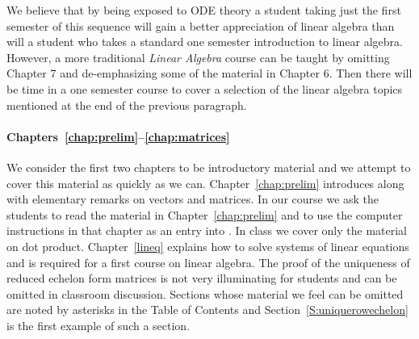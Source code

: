 \documentclass{ximera}
\begin{document}
We believe that by being exposed to ODE theory a student taking just the 
first semester of this sequence will gain a better appreciation of linear 
algebra than will a student who takes a standard one semester introduction 
to linear algebra.  However, a more traditional {\em Linear Algebra\/} course 
can be taught by omitting Chapter 7 and de-emphasizing some of the material 
in Chapter 6.  Then there will be time in a one semester course to cover a 
selection of the linear algebra topics mentioned at the end of the previous 
paragraph. 




\paragraph{Chapters~\ref{chap:prelim}--\ref{chap:matrices}}  We consider the 
first two chapters to be introductory material and we attempt to cover this 
material as quickly as we can.  Chapter~\ref{chap:prelim} introduces \Matlab 
along with elementary remarks on vectors and matrices.  In our course we ask 
the students to read the material in 
Chapter~\ref{chap:prelim} and to use the computer instructions in that
chapter as an entry into \Matlabp.  In class we cover only the material on
dot product.  Chapter~\ref{lineq} explains how to solve systems of linear
equations and is required for a first course on linear algebra.  The proof of
the uniqueness of reduced echelon form matrices is not very illuminating
for students and can be omitted in classroom discussion.  Sections whose
material we feel can be omitted are noted by asterisks in the Table of 
Contents and Section~\ref{S:uniquerowechelon} is the first example of such 
a section.
\end{document}
